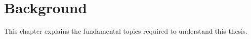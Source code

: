 \chapter{Background}
\label{ch:background}

This chapter explains the fundamental topics required to understand this thesis.




